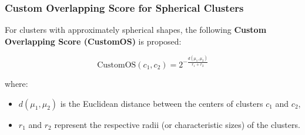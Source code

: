 \subsubsection*{Custom Overlapping Score for Spherical Clusters}

For clusters with approximately spherical shapes, the following \textbf{Custom
      Overlapping Score (CustomOS)} is proposed:

\begin{equation}
      \text{CustomOS}(c_1, c_2) = 2^{- \frac{d(\mu_1, \mu_2)}{r_1 + r_2}}
\end{equation}

where:
\begin{itemize}
      \item $ d(\mu_1, \mu_2) $ is the Euclidean distance between the centers of clusters $ c_1 $ and $ c_2 $,
      \item $ r_1 $ and $ r_2 $ represent the respective radii (or characteristic sizes) of the clusters.
\end{itemize}

